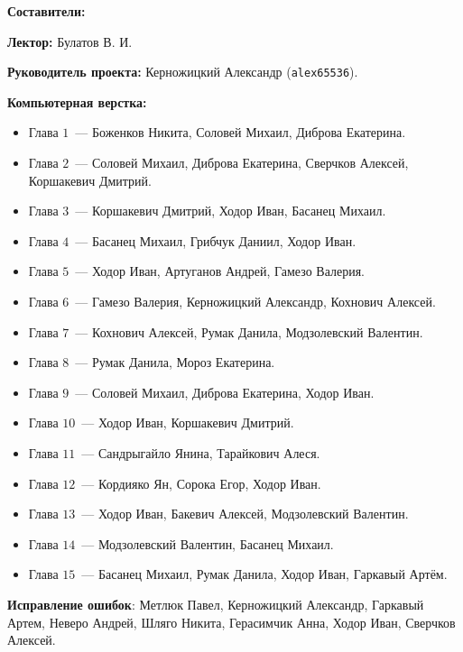 \documentclass[../main.tex]{subfiles}
\begin{document}
 

{\Huge \bf Составители:}

\vspace{2em}

{
    \textbf{Лектор:} Булатов В. И.
    
    \smallskip
    
    \textbf{Руководитель проекта:} Керножицкий Александр 
    (\texttt{alex65536}).
    
    \smallskip
    
    \textbf{Компьютерная верстка:}
    \begin{itemize}
     \item Глава $1$~--- Боженков Никита, Соловей Михаил, Диброва Екатерина.
     \item Глава $2$~--- Соловей Михаил, Диброва Екатерина, Сверчков Алексей,
     Коршакевич Дмитрий.
     \item Глава $3$~--- Коршакевич Дмитрий, Ходор Иван, Басанец Михаил.
     \item Глава $4$~--- Басанец Михаил, Грибчук Даниил, Ходор Иван.
     \item Глава $5$~--- Ходор Иван, Артуганов Андрей, Гамезо Валерия.
     \item Глава $6$~--- Гамезо Валерия, Керножицкий Александр,
     Кохнович Алексей.
     \item Глава $7$~--- Кохнович Алексей, Румак Данила, Модзолевский Валентин.
     \item Глава $8$~--- Румак Данила, Мороз Екатерина.
     \item Глава $9$~--- Соловей Михаил, Диброва Екатерина, Ходор Иван.
     \item Глава $10$~--- Ходор Иван, Коршакевич Дмитрий.
     \item Глава $11$~--- Сандрыгайло Янина, Тарайкович Алеся.
     \item Глава $12$~--- Кордияко Ян, Сорока Егор, Ходор Иван.
     \item Глава $13$~--- Ходор Иван, Бакевич Алексей, Модзолевский Валентин.
     \item Глава $14$~--- Модзолевский Валентин, Басанец Михаил.
     \item Глава $15$~--- Басанец Михаил, Румак Данила, Ходор Иван,
     Гаркавый Артём.
    \end{itemize}
    
    \textbf{Исправление ошибок}: Метлюк Павел, Керножицкий Александр, Гаркавый
    Артем, Неверо Андрей, Шляго Никита, Герасимчик Анна, Ходор Иван,
    Сверчков Алексей.
    
}
\end{document}
